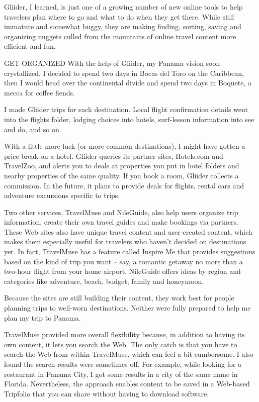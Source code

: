 ﻿\documentclass[12pt]{article}
\begin{document}
Gliider, I learned, is just one of a growing number of new online tools to help travelers plan where
to go and what to do when they get there. While still immature and somewhat buggy, they are making
finding, sorting, saving and organizing nuggets culled from the mountains of online travel content
more efficient and fun.

GET ORGANIZED With the help of Gliider, my Panama vision soon crystallized. I decided to spend two
days in Bocas del Toro on the Caribbean, then I would head over the continental divide and spend two
days in Boquete, a mecca for coffee fiends.

I made Gliider trips for each destination. Local flight confirmation details went into the flights
folder, lodging choices into hotels, surf-lesson information into see and do, and so on.

With a little more luck (or more common destinations), I might have gotten a price break on a hotel.
Gliider queries its partner sites, Hotels.com and TravelZoo, and alerts you to deals at properties
you put in hotel folders and nearby properties of the same quality. If you book a room, Gliider
collects a commission. In the future, it plans to provide deals for flights, rental cars and
adventure excursions specific to trips.

Two other services, TravelMuse and NileGuide, also help users organize trip information, create
their own travel guides and make bookings via partners. These Web sites also have unique travel
content and user-created content, which makes them especially useful for travelers who haven't
decided on destinations yet. In fact, TravelMuse has a feature called Inspire Me that provides
suggestions based on the kind of trip you want -- say, a romantic getaway no more than a two-hour
flight from your home airport. NileGuide offers ideas by region and categories like adventure,
beach, budget, family and honeymoon.

Because the sites are still building their content, they work best for people planning trips to
well-worn destinations. Neither were fully prepared to help me plan my trip to Panama.

TravelMuse provided more overall flexibility because, in addition to having its own content, it lets
you search the Web. The only catch is that you have to search the Web from within TravelMuse, which
can feel a bit cumbersome. I also found the search results were sometimes off. For example, while
looking for a restaurant in Panama City, I got some results in a city of the same name in Florida.
Nevertheless, the approach enables content to be saved in a Web-based Tripfolio that you can share
without having to download software.
\end{document}
